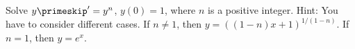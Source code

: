 {Solve $y\primeskip' = y^n$, $y(0) = 1$, where $n$ is a positive integer.
Hint: You have to consider different cases.}
{If $n \not= 1$, then
$y={\left((1-n)x+1\right)}^{1/(1-n)}$.
If $n=1$, then $y = e^x$.}